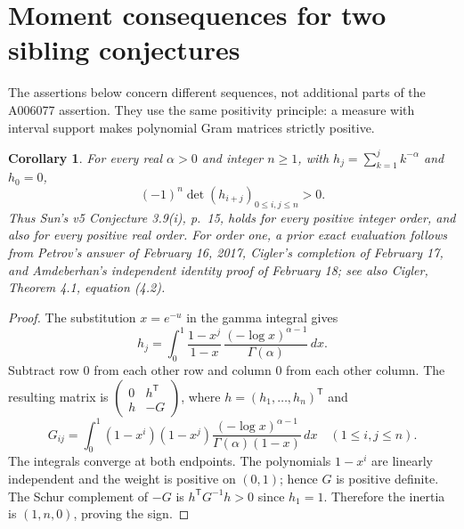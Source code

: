 \documentclass[11pt]{article}
\newtheorem{corollary}[theorem]{Corollary}
\begin{document}
\section{Moment consequences for two sibling conjectures}
The assertions below concern different sequences, not additional parts of
the A006077 assertion. They use the same positivity principle: a measure
with interval support makes polynomial Gram matrices strictly positive.

\begin{corollary}\label{cor:harmonic}
For every real $\alpha>0$ and integer $n\geq1$, with
$h_j=\sum_{k=1}^j k^{-\alpha}$ and $h_0=0$,
\[
 (-1)^n\det(h_{i+j})_{0\leq i,j\leq n}>0.
\]
Thus Sun's v5 Conjecture 3.9(i), p.~15, holds for every positive integer
order, and also for every positive real order. For order one, a prior
exact evaluation follows from Petrov's answer of February 16, 2017,
Cigler's completion of February 17, and Amdeberhan's independent identity
proof of February 18; see also Cigler, Theorem 4.1, equation (4.2)\cite{harmonic}.
\end{corollary}
\begin{proof}
The substitution $x=e^{-u}$ in the gamma integral gives
\[
 h_j=\int_0^1\frac{1-x^j}{1-x}\,
       \frac{(-\log x)^{\alpha-1}}{\Gamma(\alpha)}\,dx.
\]
Subtract row $0$ from each other row and column $0$ from each other
column. The resulting matrix is
$\left(\begin{smallmatrix}0&h^{\mathsf T}\\h&-G\end{smallmatrix}\right)$,
where $h=(h_1,\ldots,h_n)^{\mathsf T}$ and
\[
 G_{ij}=\int_0^1 (1-x^i)(1-x^j)
 \frac{(-\log x)^{\alpha-1}}{\Gamma(\alpha)(1-x)}\,dx
 \quad(1\leq i,j\leq n).
\]
The integrals converge at both endpoints. The polynomials $1-x^i$
are linearly independent and the weight is positive on $(0,1)$; hence
$G$ is positive definite. The Schur complement of $-G$ is
$h^{\mathsf T}G^{-1}h>0$ since $h_1=1$. Therefore the inertia is
$(1,n,0)$, proving the sign.
\end{proof}
\end{document}
